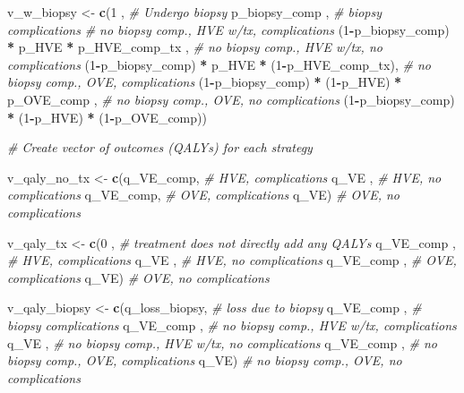 \documentclass[]{article}
\newenvironment{Shaded}{\begin{snugshade}}{\end{snugshade}}
\newcommand{\KeywordTok}[1]{\textcolor[rgb]{0.13,0.29,0.53}{\textbf{#1}}}
\newcommand{\DecValTok}[1]{\textcolor[rgb]{0.00,0.00,0.81}{#1}}
\newcommand{\StringTok}[1]{\textcolor[rgb]{0.31,0.60,0.02}{#1}}
\newcommand{\CommentTok}[1]{\textcolor[rgb]{0.56,0.35,0.01}{\textit{#1}}}
\newcommand{\OperatorTok}[1]{\textcolor[rgb]{0.81,0.36,0.00}{\textbf{#1}}}
\newcommand{\NormalTok}[1]{#1}
\begin{document}
\begin{Shaded}
\begin{Highlighting}[]
\NormalTok{  v_w_biopsy <-}\StringTok{ }\KeywordTok{c}\NormalTok{(}\DecValTok{1}\NormalTok{                                     , }\CommentTok{# Undergo biopsy}
\NormalTok{                  p_biopsy_comp                         , }\CommentTok{# biopsy complications}
                 \CommentTok{# no biopsy comp., HVE w/tx,  complications}
\NormalTok{                 (}\DecValTok{1}\OperatorTok{-}\NormalTok{p_biopsy_comp) }\OperatorTok{*}\StringTok{    }\NormalTok{p_HVE  }\OperatorTok{*}\StringTok{    }\NormalTok{p_HVE_comp_tx ,  }
                 \CommentTok{# no biopsy comp., HVE w/tx, no complications}
\NormalTok{                 (}\DecValTok{1}\OperatorTok{-}\NormalTok{p_biopsy_comp) }\OperatorTok{*}\StringTok{    }\NormalTok{p_HVE  }\OperatorTok{*}\StringTok{ }\NormalTok{(}\DecValTok{1}\OperatorTok{-}\NormalTok{p_HVE_comp_tx),  }
                 \CommentTok{# no biopsy comp., OVE, complications}
\NormalTok{                 (}\DecValTok{1}\OperatorTok{-}\NormalTok{p_biopsy_comp) }\OperatorTok{*}\StringTok{ }\NormalTok{(}\DecValTok{1}\OperatorTok{-}\NormalTok{p_HVE) }\OperatorTok{*}\StringTok{    }\NormalTok{p_OVE_comp    ,  }
                 \CommentTok{# no biopsy comp., OVE, no complications}
\NormalTok{                 (}\DecValTok{1}\OperatorTok{-}\NormalTok{p_biopsy_comp) }\OperatorTok{*}\StringTok{ }\NormalTok{(}\DecValTok{1}\OperatorTok{-}\NormalTok{p_HVE) }\OperatorTok{*}\StringTok{ }\NormalTok{(}\DecValTok{1}\OperatorTok{-}\NormalTok{p_OVE_comp))      }
  
  \CommentTok{# Create vector of outcomes (QALYs) for each strategy }
  
\NormalTok{  v_qaly_no_tx  <-}\StringTok{ }\KeywordTok{c}\NormalTok{(q_VE_comp, }\CommentTok{# HVE, complications}
\NormalTok{                     q_VE     , }\CommentTok{# HVE, no complications}
\NormalTok{                     q_VE_comp, }\CommentTok{# OVE, complications}
\NormalTok{                     q_VE)      }\CommentTok{# OVE, no complications}
  
\NormalTok{  v_qaly_tx     <-}\StringTok{ }\KeywordTok{c}\NormalTok{(}\DecValTok{0}\NormalTok{         , }\CommentTok{# treatment does not directly add any QALYs }
\NormalTok{                     q_VE_comp , }\CommentTok{# HVE, complications}
\NormalTok{                     q_VE      , }\CommentTok{# HVE, no complications}
\NormalTok{                     q_VE_comp , }\CommentTok{# OVE, complications}
\NormalTok{                     q_VE)       }\CommentTok{# OVE, no complications}
  
  
\NormalTok{  v_qaly_biopsy <-}\StringTok{ }\KeywordTok{c}\NormalTok{(q_loss_biopsy, }\CommentTok{# loss due to biopsy}
\NormalTok{                     q_VE_comp    , }\CommentTok{# biopsy complications}
\NormalTok{                     q_VE_comp    , }\CommentTok{# no biopsy comp., HVE w/tx, complications }
\NormalTok{                     q_VE         , }\CommentTok{# no biopsy comp., HVE w/tx, no complications}
\NormalTok{                     q_VE_comp    , }\CommentTok{# no biopsy comp., OVE, complications}
\NormalTok{                     q_VE)          }\CommentTok{# no biopsy comp., OVE, no complications}
  

\end{Highlighting}
\end{Shaded}
\end{document}
